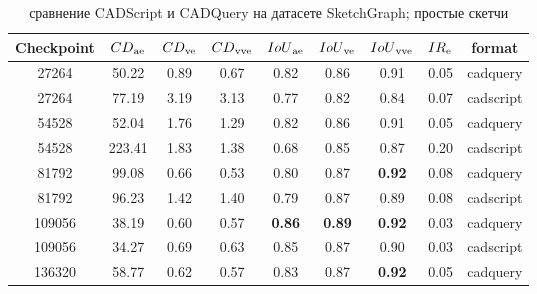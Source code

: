 \begin{table}[ht]
	\centering
	\caption{сравнение CADScript и CADQuery на датасете SketchGraph; простые скетчи}
	\label{tab:cad_comparison}
	\begin{tabular}{c c c c c c c c c}
		\hline
		\textbf{Checkpoint} & $CD\textsubscript{ae}$ & $CD\textsubscript{ve}$ & $CD\textsubscript{vve}$ & $IoU\textsubscript{ae}$ & $IoU\textsubscript{ve}$ & $IoU\textsubscript{vve}$ & $IR\textsubscript{e}$ & format    \\
		\hline
		27264               & 50.22                  & 0.89                   & 0.67                    & 0.82                    & 0.86                    & 0.91                     & 0.05                  & cadquery  \\
		27264               & 77.19                  & 3.19                   & 3.13                    & 0.77                    & 0.82                    & 0.84                     & 0.07                  & cadscript \\
		54528               & 52.04                  & 1.76                   & 1.29                    & 0.82                    & 0.86                    & 0.91                     & 0.05                  & cadquery  \\
		54528               & 223.41                 & 1.83                   & 1.38                    & 0.68                    & 0.85                    & 0.87                     & 0.20                  & cadscript \\
		81792               & 99.08                  & 0.66                   & 0.53                    & 0.80                    & 0.87                    & \textbf{0.92}            & 0.08                  & cadquery  \\
		81792               & 96.23                  & 1.42                   & 1.40                    & 0.79                    & 0.87                    & 0.89                     & 0.08                  & cadscript \\
		109056              & 38.19                  & 0.60                   & 0.57                    & \textbf{0.86}           & \textbf{0.89}           & \textbf{0.92}            & 0.03                  & cadquery  \\
		109056              & 34.27                  & 0.69                   & 0.63                    & 0.85                    & 0.87                    & 0.90                     & 0.03                  & cadscript \\
		136320              & 58.77                  & 0.62                   & 0.57                    & 0.83                    & 0.87                    & \textbf{0.92}            & 0.05                  & cadquery  \\

\end{tabular}
\end{table}
